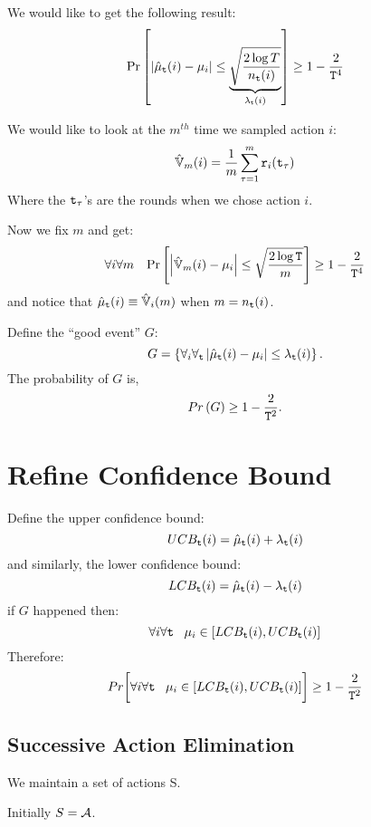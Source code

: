 We would like to get the following result:
\[
\Pr\left[\left|\hat{\mu}_{{\tt t}}(i)-\mu_{i}\right|\le\underbrace{\sqrt{\frac{2\log
T}{n_{{\tt t}}(i)}}}_{\lambda_{{\tt t}}(i)}\right]\ge1-\frac{2}{{\tt T}^{4}}
\]

We would like to look at the $m^{th}$ time we sampled action $i$:
\[
\hat{\mathbb{V}}_{m}(i)=\frac{1}{m} \sum_{\tau=1}^{m}{\tt r}_{i}({\tt t}_{\tau})
\]
Where the ${\tt t}_{\tau}$'s are the rounds when we chose action $i$.

Now we fix $m$ and get:
\[
\forall{i}\forall{m}\;\;\;
\Pr\left[\left|\hat{\mathbb{V}}_{m}(i)-\mu_{i}\right|\le\sqrt{\frac{2\log
{\tt T}}{m}}\right]\ge1-\frac{2}{{\tt T}^{4}}
\]
and notice that $\hat{\mu}_{{\tt t}}(i)\equiv\hat{\mathbb{V}}_{i}(m)$ when
$m=n_{{\tt t}}(i)$.

Define the ``good event'' $G$:
\[
G=\left\{ \forall_{i}\forall_{{\tt t}}\left|\hat{\mu}_{{\tt t}}(i)-\mu_{i}\right|\le\lambda_{{\tt t}}(i)\right\}.
\]
The probability of $G$ is,
\[
Pr\left(G\right)\ge1-\frac{2}{{\tt T}^{2}}.
\]

\section{Refine Confidence Bound}

Define the upper confidence bound:
\[
UCB_{{\tt t}}(i)=\hat{\mu}_{{\tt t}}(i)+\lambda_{{\tt t}}(i)
\]
and similarly, the lower confidence bound:
\[
LCB_{{\tt t}}(i)=\hat{\mu}_{{\tt t}}(i)-\lambda_{{\tt t}}(i)
\]
if $G$ happened then:
\[
\forall{i}\forall{{\tt t}}\;\;\;\mu_{i}\in\left[LCB_{{\tt t}}(i),UCB_{{\tt t}}(i)\right]
\]
Therefore:
\[
Pr\biggl[\forall{i}\forall{{\tt t}}\;\;\;
\mu_{i}\in\left[LCB_{{\tt t}}(i),UCB_{{\tt t}}(i)\right]\biggr]\ge1-\frac{2}{{\tt T}^{2}}
\]

\subsection{Successive Action Elimination}

We maintain a set of actions S.

Initially $S=\mathcal{A}$.

